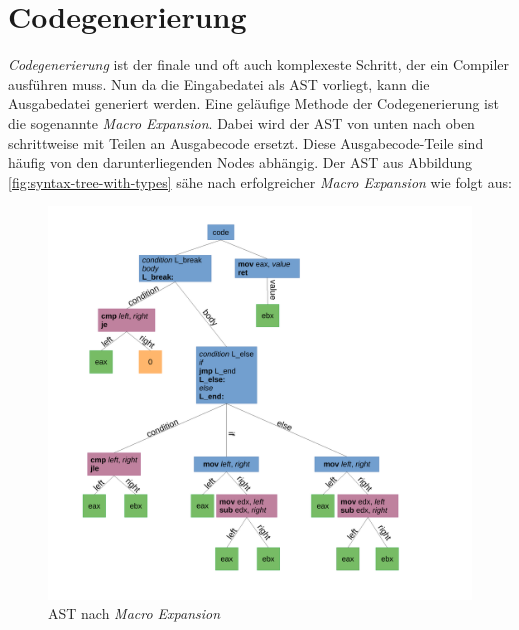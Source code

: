 \section{Codegenerierung} \label{sec:traditional_code_generation}
\textit{Codegenerierung} ist der finale und oft auch komplexeste Schritt, der ein Compiler ausführen muss.
Nun da die Eingabedatei als AST vorliegt, kann die Ausgabedatei generiert werden. Eine geläufige Methode der Codegenerierung ist die sogenannte \textit{Macro Expansion}.
Dabei wird der AST von unten nach oben schrittweise mit Teilen an Ausgabecode ersetzt.
Diese Ausgabecode-Teile sind häufig von den darunterliegenden Nodes abhängig. Der AST aus Abbildung \ref{fig:syntax-tree-with-types} sähe nach erfolgreicher \textit{Macro Expansion} wie folgt aus:

\begin{figure}[H]
    \centering
    \includegraphics[scale=0.4]{resources/images/AST_macro_expansion.pdf}
    \caption[AST nach \textit{Macro Expansion}. (Basierend auf Abbildung \ref{fig:syntax-tree})]{AST nach \textit{Macro Expansion}}
    \label{fig:syntax-tree-after-macro-expansion}
\end{figure}

